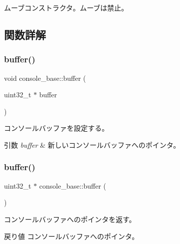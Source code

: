 ムーブコンストラクタ。ムーブは禁止。 

\subsection{関数詳解}
\hypertarget{classconsole__base_a98b7835fa6b24b8d8e54f5531406a305}{}\label{classconsole__base_a98b7835fa6b24b8d8e54f5531406a305} 
\subsubsection{\texorpdfstring{buffer()}{buffer()}\hspace{0.1cm}{\footnotesize\ttfamily [1/2]}}
{\footnotesize\ttfamily void console\+\_\+base\+::buffer (\begin{DoxyParamCaption}\item[{uint32\+\_\+t $\ast$}]{buffer }\end{DoxyParamCaption})}

コンソールバッファを設定する。 
\begin{DoxyParams}{引数}
{\em buffer} & 新しいコンソールバッファへのポインタ。 \\
\hline
\end{DoxyParams}
\hypertarget{classconsole__base_a9bdd8fb03a4380e2793fa35298bb3fc4}{}\label{classconsole__base_a9bdd8fb03a4380e2793fa35298bb3fc4} 
\subsubsection{\texorpdfstring{buffer()}{buffer()}\hspace{0.1cm}{\footnotesize\ttfamily [2/2]}}
{\footnotesize\ttfamily uint32\+\_\+t $\ast$ console\+\_\+base\+::buffer (\begin{DoxyParamCaption}{ }\end{DoxyParamCaption})}

コンソールバッファへのポインタを返す。 \begin{DoxyReturn}{戻り値}
コンソールバッファへのポインタ。 
\end{DoxyReturn}
\hypertarget{classconsole__base_a625c2d1eede5ce568765ba84b2e30c6a}{}\label{classconsole__base_a625c2d1eede5ce568765ba84b2e30c6a} 
